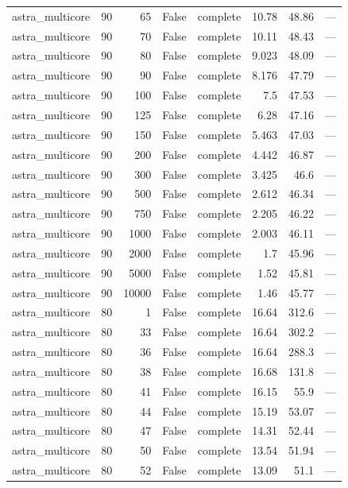 \begin{tabular}{lrrrlrrl}
astra\_multicore & 90 & 65 & False & complete & 10.78 & 48.86 & — \\
astra\_multicore & 90 & 70 & False & complete & 10.11 & 48.43 & — \\
astra\_multicore & 90 & 80 & False & complete & 9.023 & 48.09 & — \\
astra\_multicore & 90 & 90 & False & complete & 8.176 & 47.79 & — \\
astra\_multicore & 90 & 100 & False & complete & 7.5 & 47.53 & — \\
astra\_multicore & 90 & 125 & False & complete & 6.28 & 47.16 & — \\
astra\_multicore & 90 & 150 & False & complete & 5.463 & 47.03 & — \\
astra\_multicore & 90 & 200 & False & complete & 4.442 & 46.87 & — \\
astra\_multicore & 90 & 300 & False & complete & 3.425 & 46.6 & — \\
astra\_multicore & 90 & 500 & False & complete & 2.612 & 46.34 & — \\
astra\_multicore & 90 & 750 & False & complete & 2.205 & 46.22 & — \\
astra\_multicore & 90 & 1000 & False & complete & 2.003 & 46.11 & — \\
astra\_multicore & 90 & 2000 & False & complete & 1.7 & 45.96 & — \\
astra\_multicore & 90 & 5000 & False & complete & 1.52 & 45.81 & — \\
astra\_multicore & 90 & 10000 & False & complete & 1.46 & 45.77 & — \\
astra\_multicore & 80 & 1 & False & complete & 16.64 & 312.6 & — \\
astra\_multicore & 80 & 33 & False & complete & 16.64 & 302.2 & — \\
astra\_multicore & 80 & 36 & False & complete & 16.64 & 288.3 & — \\
astra\_multicore & 80 & 38 & False & complete & 16.68 & 131.8 & — \\
astra\_multicore & 80 & 41 & False & complete & 16.15 & 55.9 & — \\
astra\_multicore & 80 & 44 & False & complete & 15.19 & 53.07 & — \\
astra\_multicore & 80 & 47 & False & complete & 14.31 & 52.44 & — \\
astra\_multicore & 80 & 50 & False & complete & 13.54 & 51.94 & — \\
astra\_multicore & 80 & 52 & False & complete & 13.09 & 51.1 & — \\

\end{tabular}
